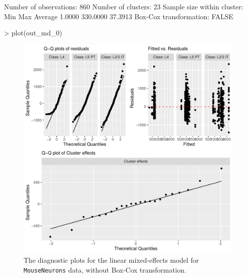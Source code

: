 {\begin{example}
Number of observations: 860 
Number of clusters: 23 
Sample size within cluster:
     Min      Max  Average 
  1.0000 330.0000  37.3913 
Box-Cox transformation: FALSE 
\end{example}

\begin{example}
> plot(out_md_0)
\end{example}

\begin{figure}[htbp]
\centering 
\includegraphics[width=0.7\linewidth]{diagnosis_model_0.pdf}
\caption{The diagnostic plots for the linear mixed-effects model for \texttt{MouseNeurons} data, without Box-Cox transformation.}
\label{fig:diag-md-0}
\end{figure}
}

\address{%
Duc-Khanh To\\
University of Padova\\%
Department of Statistical Sciences\\ Via C. Battisti, 241; I-35121
Padova, Italy\\
%
%
\textit{ORCiD: \href{https://orcid.org/0000-0002-4641-0764}{0000-0002-4641-0764}}\\%
\href{mailto:duckhanh.to@unipd.it}{\nolinkurl{duckhanh.to@unipd.it}}%
}

\address{%
Gianfranco Adimari\\
University of Padova\\%
Department of Statistical Sciences\\ Via C. Battisti, 241; I-35121
Padova, Italy\\
%
%
\textit{ORCiD: \href{https://orcid.org/0000-0002-7811-912X}{0000-0002-7811-912X}}\\%
\href{mailto:gianfranco.adimari@unipd.it}{\nolinkurl{gianfranco.adimari@unipd.it}}%
}

\address{%
Monica Chiogna\\
University of Bologna\\%
Department of Statistical Sciences ``Paolo Fortunati'\,'\\ Via Belle
Arti, 41; 40126 Bologna, Italy\\
%
%
\textit{ORCiD: \href{https://orcid.org/0000-0002-7238-3739}{0000-0002-7238-3739}}\\%
\href{mailto:monica.chiogna2@unibo.it}{\nolinkurl{monica.chiogna2@unibo.it}}%
}

